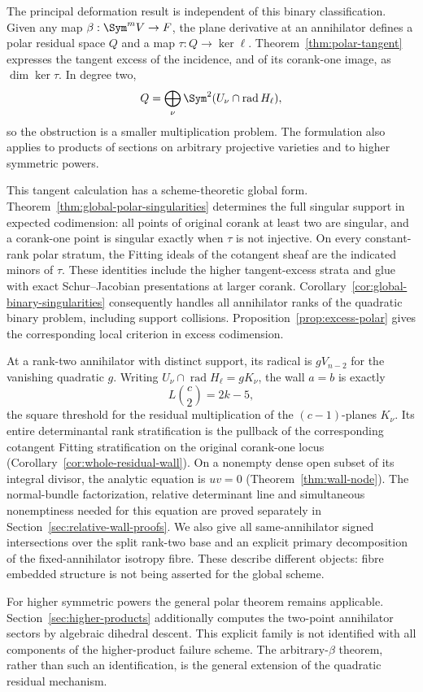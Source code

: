 The principal deformation result is independent of this binary
classification. Given any map $\beta:\Sym^m V\to F$, the plane
derivative at an annihilator defines a polar residual space $Q$ and
a map $\tau:Q\to\ker\ell$. Theorem~\ref{thm:polar-tangent}
expresses the tangent excess of the incidence, and of its corank-one
image, as $\dim\ker\tau$. In degree two,
\[
 Q=\bigoplus_\nu\Sym^2(U_\nu\cap\operatorname{rad}H_\ell),
\]
so the obstruction is a smaller multiplication problem. The formulation
also applies to products of sections on arbitrary projective varieties
and to higher symmetric powers.

This tangent calculation has a scheme-theoretic global form.
Theorem~\ref{thm:global-polar-singularities} determines the full
singular support in expected codimension: all points of original
corank at least two are singular, and a corank-one point is singular
exactly when $\tau$ is not injective. On every constant-rank polar
stratum, the Fitting ideals of the cotangent sheaf are the indicated
minors of $\tau$. These identities include the higher tangent-excess
strata and glue with exact Schur--Jacobian presentations at larger
corank. Corollary~\ref{cor:global-binary-singularities} consequently
handles all annihilator ranks of the quadratic binary problem,
including support collisions. Proposition~\ref{prop:excess-polar}
gives the corresponding local criterion in excess codimension.

At a rank-two annihilator with distinct support, its radical is
$gV_{n-2}$ for the vanishing quadratic $g$. Writing
$U_\nu\cap\operatorname{rad}H_\ell=gK_\nu$, the wall $a=b$
is exactly
\[
 L\binom c2=2k-5,
\]
the square threshold for the residual multiplication of the
$(c-1)$-planes $K_\nu$. Its entire determinantal rank stratification
is the pullback of the corresponding cotangent Fitting stratification
on the original corank-one locus
(Corollary~\ref{cor:whole-residual-wall}). On a nonempty dense
open subset of its integral divisor, the analytic equation is $uv=0$
(Theorem~\ref{thm:wall-node}). The normal-bundle factorization,
relative determinant line and simultaneous nonemptiness needed for
this equation are proved separately in
Section~\ref{sec:relative-wall-proofs}. We also give all
same-annihilator signed intersections over the split rank-two base
and an explicit primary decomposition of the fixed-annihilator
isotropy fibre. These describe different objects: fibre embedded
structure is not being asserted for the global scheme.

For higher symmetric powers the general polar theorem remains
applicable. Section~\ref{sec:higher-products} additionally computes
the two-point annihilator sectors by algebraic dihedral descent.
This explicit family is not identified with all components of the
higher-product failure scheme. The arbitrary-$\beta$ theorem,
rather than such an identification, is the general extension of the
quadratic residual mechanism.

